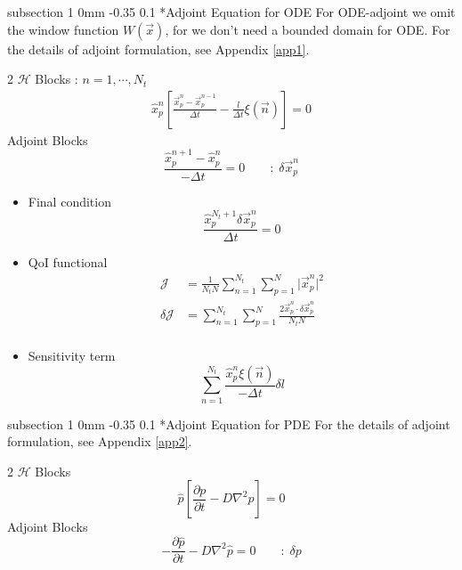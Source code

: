 \documentclass[11pt]{article}
\makeatletter
\renewcommand{\subsection}{\@startsection
{subsection}%
{1}%
{0mm}%
{-0.35\baselineskip}%
{0.1\baselineskip}%
{\normalfont\large\bfseries\color{brown}}}%
\def\Dpartial#1#2{ \frac{\partial #1}{\partial #2} }
\newcommand{\vn}{\vec{n}}
\newcommand{\vx}{\vec{x}}
\newcommand{\xp}{\vec{x}_p}
\newcommand{\Dt}{\Delta t}
\newcommand{\xph}{\hat{x}_p}
\newcommand{\cH}{\mathcal{H}}
\newcommand{\cJ}{\mathcal{J}}
\makeatother
\begin{document}
\subsection*{Adjoint Equation for ODE}
For ODE-adjoint we omit the window function $W(\vx)$, for we don't need a bounded domain for ODE.
For the details of adjoint formulation, see Appendix \ref{app1}.
\begin{multicols}{2}
$\cH$ Blocks : $n=1, \cdots , N_t$
\begin{equation*}
\begin{split}
\xph^n\left[ \frac{\xp^n - \xp^{n-1}}{\Dt} - \frac{l}{\Dt}\xi(\vn) \right] = 0
\end{split}
\end{equation*}
Adjoint Blocks
\begin{equation*}
\frac{\xph^{n+1} - \xph^n}{-\Dt} = 0 \qquad :\;\delta\xp^n
\end{equation*}
\end{multicols}
\begin{itemize}
\item Final condition
\begin{equation*}
\frac{\xph^{N_t+1}\delta\xp^n}{\Dt} = 0
\end{equation*}
\item QoI functional
\begin{equation*}
\begin{split}
\cJ &= \frac{1}{N_tN}\sum_{n=1}^{N_t}\sum_{p=1}^{N}\vert \xp^n \vert^2\\
\delta \cJ &= \sum_{n=1}^{N_t}\sum_{p=1}^{N} \frac{2\xp^n\cdot \delta\xp^n}{N_tN}\\
\end{split}
\end{equation*}
\item Sensitivity term
\begin{equation*}
\sum_{n=1}^{N_t}\frac{\xph^{n}\xi(\vn)}{-\Dt}\delta l
\end{equation*}
\end{itemize}

\subsection*{Adjoint Equation for PDE}
For the details of adjoint formulation, see Appendix \ref{app2}.
\begin{multicols}{2}
$\cH$ Blocks 
\begin{equation*}
\hat{p}\left[ \Dpartial{p}{t} - D\nabla^2p \right] = 0
\end{equation*}
Adjoint Blocks
\begin{equation*}
-\Dpartial{\hat{p}}{t} - D\nabla^2\hat{p} = 0 \qquad :\;\delta p
\end{equation*}
\end{multicols}
\end{document}
